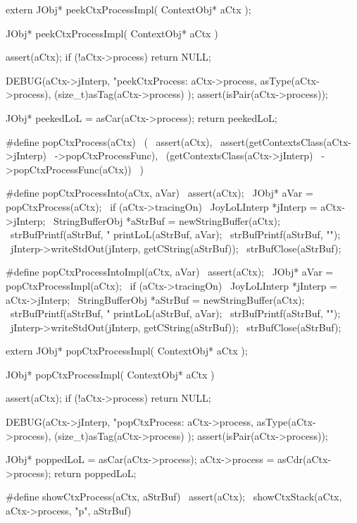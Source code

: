 \startCHeader
extern JObj* peekCtxProcessImpl(
  ContextObj* aCtx
);
\stopCHeader
{}

\startCCode
JObj* peekCtxProcessImpl(
  ContextObj* aCtx
) {
  assert(aCtx);
  if (!aCtx->process) return NULL;

  DEBUG(aCtx->jInterp, "peekCtxProcess: %
    aCtx->process, asType(aCtx->process), (size_t)asTag(aCtx->process)
  );
  assert(isPair(aCtx->process));
  
  JObj* peekedLoL = asCar(aCtx->process);
  return peekedLoL;
}
\stopCCode

\startCHeader
#define popCtxProcess(aCtx)                    \
  (                                            \
    assert(aCtx),                              \
    assert(getContextsClass(aCtx->jInterp)     \
      ->popCtxProcessFunc),                    \
    (getContextsClass(aCtx->jInterp)           \
      ->popCtxProcessFunc(aCtx))               \
  )

#define popCtxProcessInto(aCtx, aVar)                  \
assert(aCtx);                                          \
JObj* aVar = popCtxProcess(aCtx);                      \
if (aCtx->tracingOn) {                                 \
  JoyLoLInterp *jInterp = aCtx->jInterp;               \
  StringBufferObj *aStrBuf = newStringBuffer(aCtx);    \
  strBufPrintf(aStrBuf, "%
  printLoL(aStrBuf, aVar);                             \
  strBufPrintf(aStrBuf, "\n");                         \
  jInterp->writeStdOut(jInterp, getCString(aStrBuf));  \
  strBufClose(aStrBuf);                                \
}

#define popCtxProcessIntoImpl(aCtx, aVar)              \
assert(aCtx);                                          \
JObj* aVar = popCtxProcessImpl(aCtx);                  \
if (aCtx->tracingOn) {                                 \
  JoyLoLInterp *jInterp = aCtx->jInterp;               \
  StringBufferObj *aStrBuf = newStringBuffer(aCtx);    \
  strBufPrintf(aStrBuf, "%
  printLoL(aStrBuf, aVar);                             \
  strBufPrintf(aStrBuf, "\n");                         \
  jInterp->writeStdOut(jInterp, getCString(aStrBuf));  \
  strBufClose(aStrBuf);                                \
}
\stopCHeader

\setCHeaderStream{private}
\startCHeader
extern JObj* popCtxProcessImpl(
  ContextObj* aCtx
);
\stopCHeader
\setCHeaderStream{public}

\startCCode
JObj* popCtxProcessImpl(
  ContextObj* aCtx
) {
  assert(aCtx);
  if (!aCtx->process) return NULL;

  DEBUG(aCtx->jInterp, "popCtxProcess: %
    aCtx->process, asType(aCtx->process), (size_t)asTag(aCtx->process)
  );
  assert(isPair(aCtx->process));
  
  JObj* poppedLoL = asCar(aCtx->process);
  aCtx->process   = asCdr(aCtx->process);
  return poppedLoL;
}
\stopCCode

\startCHeader
#define showCtxProcess(aCtx, aStrBuf)             \
  assert(aCtx);                                   \
  showCtxStack(aCtx, aCtx->process, "p", aStrBuf)
\stopCHeader


